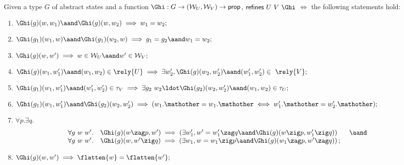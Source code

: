 \begin{definition}
\label{def:hid-pred}

Given a type $G$ of abstract states and a function $\Ghi: G
\rightarrow ({\cal W}_U, {\cal W}_V) \rightarrow \mathsf{prop}$,
$\mathsf{refines}~U~V~{\Ghi}$ $\iff$ the following statements
hold:

\begin{enumerate}
\item $\Ghi(g)(w, w_1) \aand \Ghi(g)(w, w_2) 
\implies w_1 = w_2;$

\item $\Ghi(g_1)(w_1, w) \aand
  \Ghi(g_1)(w_2, w) \implies g_1 = g_2 \aand w_1 = w_2;$

\item $\Ghi(g)(w, w') \implies w \in {\cal W}_U
  \aand w' \in {\cal W}_V;$

\item $\Ghi(g)(w_1, w_1') \aand (w_1, w_2)
  \in \rely{U} \implies \exists w_2', \Ghi(g)(w_2, w_2') \aand (w_1',
  w_2') \in~\rely{V};$

\item $\Ghi(g_1)(w_1, w_1') \aand (w_1',
  w_2') \in \tau_V \implies \exists g_2\ w_2\ldot \Ghi(g_2)(w_2, w_2') \aand (w_1, w_2) \in \tau_U;$

\item $\Ghi(g_1)(w_1, w_1') \aand \Ghi(g_2)(w_2, w_2') \implies
  (w_1.\mathother = w_1.\mathother \iff w_1'.\mathother = w_2'.\mathother);$

\item $\forall p. \exists q.$
\[
\begin{array}{llc}  
\forall g~w~w'. & \Ghi(g)(w \zag p, w') \implies
\left(\exists w_1', w' = w_1' \zag q \aand \Ghi(g)(w \zig p, w_1' \zig
  q) \right)
& ~\aand \\
\forall g~w~w'. & \Ghi(g)(w, w' \zig q) \implies
\left(\exists w_1, w = w_1 \zig p \aand \Ghi(g)(w_1 \zag p, w' \zag
  q) \right); 
\end{array}
\]

\item 
$\Ghi(g)(w, w') \implies \flatten{w} = \flatten{w'};$


\end{enumerate}

\end{definition}


